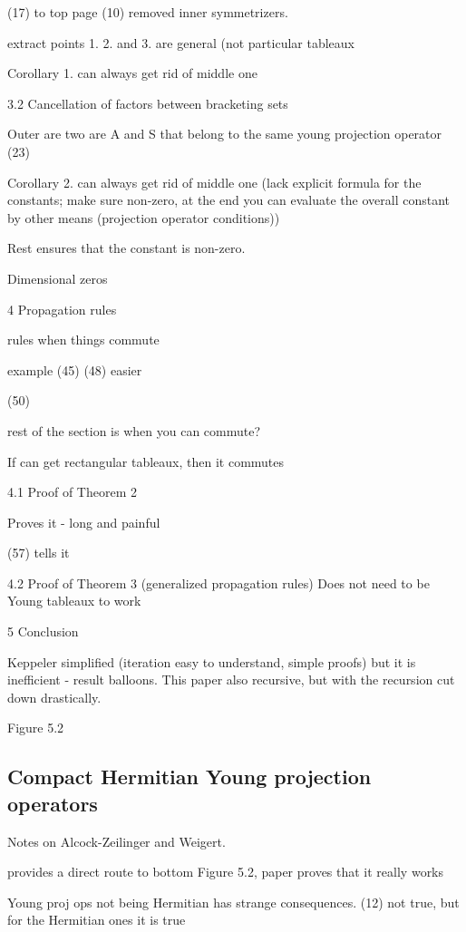 (17) to top page (10) removed inner symmetrizers.

extract points 1. 2. and 3. are general (not particular tableaux

Corollary 1. can always get rid of middle one

3.2 Cancellation of factors between bracketing sets

Outer are two are A and S that belong to the same young projection operator
(23)

Corollary 2. can always get rid of middle one (lack explicit formula
for the constants; make sure non-zero, at the end you can evaluate
the overall constant by other means (projection operator conditions))

Rest ensures that the constant is non-zero.

Dimensional zeros

4 Propagation rules

rules when things commute

example (45)
(48) easier

(50)

rest of the section is when you can commute?

If can get rectangular tableaux, then it commutes

4.1 Proof of Theorem 2

Proves it - long and painful

(57) tells it

4.2 Proof of Theorem 3 (generalized propagation rules)
Does not need to be Young tableaux to work

5 Conclusion

Keppeler simplified (iteration easy to understand, simple proofs) but it is
inefficient - result balloons. This paper also recursive, but with the recursion
cut down drastically.

Figure 5.2


\subsection{Compact {Hermitian Young} projection operators}
\label{s-AlcZei16-2}

Notes on Alcock-Zeilinger and Weigert.




provides a direct route to bottom Figure 5.2, paper proves that it really works

Young proj ops not being Hermitian has strange consequences.
(12) not true, but for the Hermitian ones it is true



